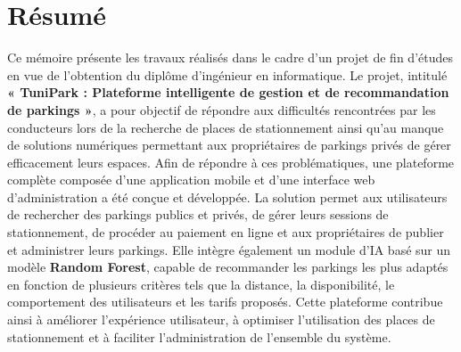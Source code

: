 \chapter*{Résumé}

\par Ce mémoire présente les travaux réalisés dans le cadre d'un projet de fin d'études en vue de l'obtention du diplôme d'ingénieur en informatique. Le projet, intitulé \textbf{« TuniPark : Plateforme intelligente de gestion et de recommandation de parkings »}, a pour objectif de répondre aux difficultés rencontrées par les conducteurs lors de la recherche de places de stationnement ainsi qu'au manque de solutions numériques permettant aux propriétaires de parkings privés de gérer efficacement leurs espaces. Afin de répondre à ces problématiques, une plateforme complète composée d'une application mobile et d'une interface web d'administration a été conçue et développée. La solution permet aux utilisateurs de rechercher des parkings publics et privés, de gérer leurs sessions de stationnement, de procéder au paiement en ligne et aux propriétaires de publier et administrer leurs parkings. Elle intègre également un module d'IA basé sur un modèle \textbf{Random Forest}, capable de recommander les parkings les plus adaptés en fonction de plusieurs critères tels que la distance, la disponibilité, le comportement des utilisateurs et les tarifs proposés. Cette plateforme contribue ainsi à améliorer l'expérience utilisateur, à optimiser l'utilisation des places de stationnement et à faciliter l'administration de l'ensemble du système.

\vspace{0.5cm}

